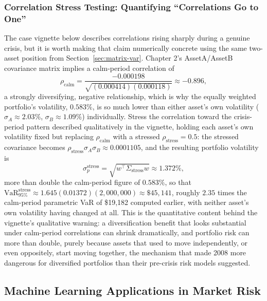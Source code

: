 \documentclass[../ai_in_finance]{subfiles}
\begin{document}
\subsubsection*{Correlation Stress Testing: Quantifying ``Correlations Go to One''}

The case vignette below describes correlations rising sharply during a genuine crisis, but it is worth making that claim numerically concrete using the same two-asset position from Section~\ref{sec:matrix-var}. Chapter 2's AssetA/AssetB covariance matrix implies a calm-period correlation of
\begin{equation*}
\rho_{\text{calm}} = \frac{-0.000198}{\sqrt{(0.000414)(0.000118)}} \approx -0.896,
\end{equation*}
a strongly diversifying, negative relationship, which is why the equally weighted portfolio's volatility, $0.583\%$, is so much lower than either asset's own volatility ($\sigma_A \approx 2.03\%$, $\sigma_B \approx 1.09\%$) individually. Stress the correlation toward the crisis-period pattern described qualitatively in the vignette, holding each asset's own volatility fixed but replacing $\rho_{\text{calm}}$ with a stressed $\rho_{\text{stress}} = 0.5$: the stressed covariance becomes $\rho_{\text{stress}}\sigma_A\sigma_B \approx 0.0001105$, and the resulting portfolio volatility is
\begin{equation*}
\sigma_p^{\text{stress}} = \sqrt{w^\top \Sigma_{\text{stress}} w} \approx 1.372\%,
\end{equation*}
more than double the calm-period figure of $0.583\%$, so that $\text{VaR}_{95\%}^{\text{stress}} \approx 1.645(0.01372)(2{,}000{,}000) \approx \$45{,}141$, roughly $2.35$ times the calm-period parametric VaR of \$19,182 computed earlier, with neither asset's own volatility having changed at all.
This is the quantitative content behind the vignette's qualitative warning: a diversification benefit that looks substantial under calm-period correlations can shrink dramatically, and portfolio risk can more than double, purely because assets that used to move independently, or even oppositely, start moving together, the mechanism that made 2008 more dangerous for diversified portfolios than their pre-crisis risk models suggested.

\subsection{Machine Learning Applications in Market Risk}
\end{document}
